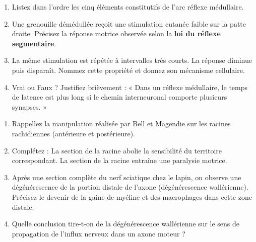 \documentclass[11pt]{article}
\begin{document}
\begin{exercice}
\begin{enumerate}
    \item Listez dans l'ordre les cinq éléments constitutifs de l'arc réflexe médullaire.
    \item Une grenouille démédullée reçoit une stimulation cutanée faible sur la patte droite. Précisez la réponse motrice observée selon la \textbf{loi du réflexe segmentaire}.
    \item La même stimulation est répétée à intervalles très courts. La réponse diminue puis disparaît. Nommez cette propriété et donnez son mécanisme cellulaire.
    \item Vrai ou Faux ? Justifiez brièvement : « Dans un réflexe médullaire, le temps de latence est plus long si le chemin interneuronal comporte plusieurs synapses. »
\end{enumerate}
\end{exercice}

\begin{exercice}
\begin{enumerate}
    \item Rappellez la manipulation réalisée par Bell et Magendie sur les racines rachidiennes (antérieure et postérieure).
    \item Complétez : La section de la racine \underline{\hspace{3cm}} abolie la sensibilité du territoire correspondant. La section de la racine \underline{\hspace{3cm}} entraîne une paralysie motrice.
    \item Après une section complète du nerf sciatique chez le lapin, on observe une dégénérescence de la portion distale de l'axone (dégénérescence wallérienne). Précisez le devenir de la gaine de myéline et des macrophages dans cette zone distale.
    \item Quelle conclusion tire-t-on de la dégénérescence wallérienne sur le sens de propagation de l'influx nerveux dans un axone moteur ?
\end{enumerate}
\end{exercice}
\end{document}
